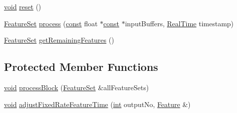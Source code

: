 \begin{DoxyCompactItemize}
\item 
\hyperlink{sound_8c_ae35f5844602719cf66324f4de2a658b3}{void} \hyperlink{class_vamp_1_1_host_ext_1_1_plugin_buffering_adapter_1_1_impl_a102263ad3dc229a1292792d73da2f0a1}{reset} ()
\item 
\hyperlink{class_vamp_1_1_plugin_a448fb57dc245d47923ec9eeaf9856c5f}{Feature\+Set} \hyperlink{class_vamp_1_1_host_ext_1_1_plugin_buffering_adapter_1_1_impl_a03718981c892400287483cc8501adfeb}{process} (\hyperlink{getopt1_8c_a2c212835823e3c54a8ab6d95c652660e}{const} float $\ast$\hyperlink{getopt1_8c_a2c212835823e3c54a8ab6d95c652660e}{const} $\ast$input\+Buffers, \hyperlink{struct_vamp_1_1_real_time}{Real\+Time} timestamp)
\item 
\hyperlink{class_vamp_1_1_plugin_a448fb57dc245d47923ec9eeaf9856c5f}{Feature\+Set} \hyperlink{class_vamp_1_1_host_ext_1_1_plugin_buffering_adapter_1_1_impl_a242913f6f438bef150e270cbeeacf711}{get\+Remaining\+Features} ()
\end{DoxyCompactItemize}
\subsection*{Protected Member Functions}
\begin{DoxyCompactItemize}
\item 
\hyperlink{sound_8c_ae35f5844602719cf66324f4de2a658b3}{void} \hyperlink{class_vamp_1_1_host_ext_1_1_plugin_buffering_adapter_1_1_impl_a65f718273e06cb3d2e0ef09ca173aa54}{process\+Block} (\hyperlink{class_vamp_1_1_plugin_a448fb57dc245d47923ec9eeaf9856c5f}{Feature\+Set} \&all\+Feature\+Sets)
\item 
\hyperlink{sound_8c_ae35f5844602719cf66324f4de2a658b3}{void} \hyperlink{class_vamp_1_1_host_ext_1_1_plugin_buffering_adapter_1_1_impl_a217ef4f70bfa7d931cd98166521e59b9}{adjust\+Fixed\+Rate\+Feature\+Time} (\hyperlink{xmltok_8h_a5a0d4a5641ce434f1d23533f2b2e6653}{int} output\+No, \hyperlink{struct_vamp_1_1_plugin_1_1_feature}{Feature} \&)
\end{DoxyCompactItemize}
